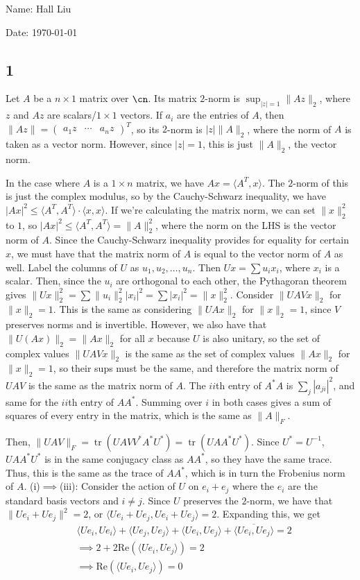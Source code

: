 \documentclass{article}
\newcommand{\conj}{\overline}
\newcommand{\openm}{\begin{pmatrix}}
\newcommand{\closem}{\end{pmatrix}}
\DeclareMathOperator{\tr}{tr}
\begin{document}
Name: Hall Liu

Date: \today 
\vspace{1.5cm}

\subsection*{1}
Let $A$ be a $n\times 1$ matrix over $\cn$. Its matrix $2$-norm is $\sup_{|z|=1}\|Az\|_2$, where $z$ and $Az$ are scalars/$1\times 1$ vectors. If $a_i$ are the entries of $A$, then $\|Az\|=\openm a_1z&\cdots&a_nz\closem^T$, so its $2$-norm is $|z|\|A\|_2$, where the norm of $A$ is taken as a vector norm. However, since $|z|=1$, this is just $\|A\|_2$, the vector norm.

In the case where $A$ is a $1\times n$ matrix, we have $Ax=\langle A^T,x\rangle$. The $2$-norm of this is just the complex modulus, so by the Cauchy-Schwarz inequality, we have $|Ax|^2\leq\langle A^T,A^T\rangle\cdot\langle x,x\rangle$. If we're calculating the matrix norm, we can set $\|x\|_2^2$ to $1$, so $|Ax|^2\leq\langle A^T,A^T\rangle=\|A\|_2^2$, where the norm on the LHS is the vector norm of $A$. Since the Cauchy-Schwarz inequality provides for equality for certain $x$, we must have that the matrix norm of $A$ is equal to the vector norm of $A$ as well.
Label the columns of $U$ as $u_1,u_2,\ldots,u_n$. Then $Ux=\sum u_ix_i$, where $x_i$ is a scalar. Then, since the $u_i$ are orthogonal to each other, the Pythagoran theorem gives $\|Ux\|_2^2=\sum \|u_i\|_2^2|x_i|^2=\sum|x_i|^2=\|x\|_2^2$.
Consider $\|UAVx\|_2$ for $\|x\|_2=1$. This is the same as considering $\|UAx\|_2$ for $\|x\|_2=1$, since $V$ preserves norms and is invertible. However, we also have that $\|U(Ax)\|_2=\|Ax\|_2$ for all $x$ because $U$ is also unitary, so the set of complex values $\|UAVx\|_2$ is the same as the set of complex values $\|Ax\|_2$ for $\|x\|_2=1$, so their sups must be the same, and therefore the matrix norm of $UAV$ is the same as the matrix norm of $A$.
The $ii$th entry of $A^*A$ is $\sum_j|a_{ji}|^2$, and same for the $ii$th entry of $AA^*$. Summing over $i$ in both cases gives a sum of squares of every entry in the matrix, which is the same as $\|A\|_F$. 

Then, $\|UAV\|_F=\tr(UAVV^*A^*U^*)=\tr(UAA^*U^*)$. Since $U^*=U^{-1}$, $UAA^*U^*$ is in the same conjugacy class as $AA^*$, so they have the same trace. Thus, this is the same as the trace of $AA^*$, which is in turn the Frobenius norm of $A$.
(i)$\implies$(iii):
Consider the action of $U$ on $e_i+e_j$ where the $e_i$ are the standard basis vectors and $i\neq j$. Since $U$ preserves the $2$-norm, we have that $\|Ue_i+Ue_j\|^2=2$, or $\langle Ue_i+Ue_j,Ue_i+Ue_j\rangle=2$. Expanding this, we get 
\begin{align*}
    &\langle Ue_i,Ue_i\rangle+\langle Ue_j,Ue_j\rangle+\langle Ue_i,Ue_j\rangle+\conj{\langle Ue_i,Ue_j\rangle}=2\\
    &\implies2+2\text{Re}(\langle Ue_i,Ue_j\rangle)=2\\
    &\implies \text{Re}(\langle Ue_i,Ue_j\rangle)=0
\end{align*}
\end{document}
